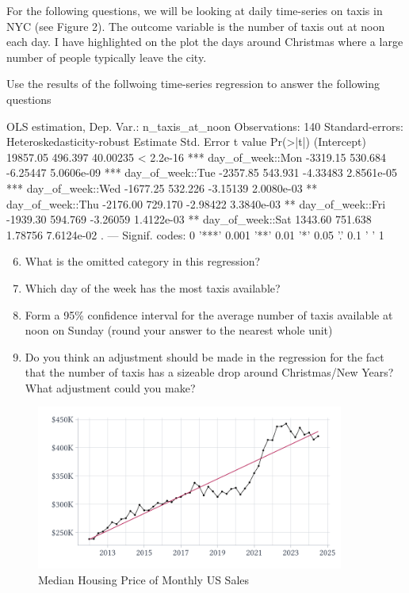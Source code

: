 \documentclass[12pt]{article}
\begin{document}
\newpage
\noindent For the following questions, we will be looking at daily time-series on taxis in NYC (see Figure 2). The outcome variable is the number of taxis out at noon each day. I have highlighted on the plot the days around Christmas where a large number of people typically leave the city.

Use the results of the follwoing time-series regression to answer the following questions
\begin{codeblock}[{}]
OLS estimation, Dep. Var.: n_taxis_at_noon
Observations: 140
Standard-errors: Heteroskedasticity-robust 
                  Estimate Std. Error  t value   Pr(>|t|)    
(Intercept)      19857.05    496.397 40.00235  < 2.2e-16 ***
day_of_week::Mon -3319.15    530.684 -6.25447 5.0606e-09 ***
day_of_week::Tue -2357.85    543.931 -4.33483 2.8561e-05 ***
day_of_week::Wed -1677.25    532.226 -3.15139 2.0080e-03 ** 
day_of_week::Thu -2176.00    729.170 -2.98422 3.3840e-03 ** 
day_of_week::Fri -1939.30    594.769 -3.26059 1.4122e-03 ** 
day_of_week::Sat  1343.60    751.638  1.78756 7.6124e-02 .   
---
Signif. codes:  0 '***' 0.001 '**' 0.01 '*' 0.05 '.' 0.1 ' ' 1
\end{codeblock}

\begin{enumerate}
  \setcounter{enumi}{5}
  \item What is the omitted category in this regression?
  
  \item Which day of the week has the most taxis available? 
  
  \item Form a 95\% confidence interval for the average number of taxis available at noon on Sunday (round your answer to the nearest whole unit)
    
  \item Do you think an adjustment should be made in the regression for the fact that the number of taxis has a sizeable drop around Christmas/New Years? What adjustment could you make?
\end{enumerate}


\newpage
\begin{figure}[h!]
  \caption{Median Housing Price of Monthly US Sales}
  \label{fig:housing}
  
  \vspace*{-\bigskipamount}
  \begin{center}
    \includegraphics[width = 0.9\textwidth]{figures/median_us_housing_price_raw.pdf}
  \end{center}
\end{figure}
\end{document}
